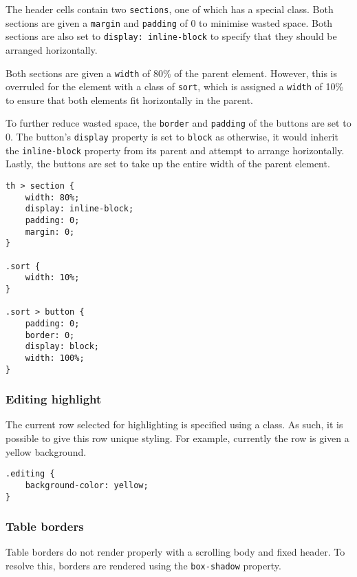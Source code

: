 \documentclass[letterpaper]{article}
\begin{document}
The header cells contain two \lstinline{sections}, one of which has a special class.
Both sections are given a \lstinline{margin} and \lstinline{padding} of 0 to minimise wasted space.
Both sections are also set to \lstinline{display: inline-block} to specify that they should be arranged horizontally.

Both sections are given a \lstinline{width} of 80\% of the parent element.
However, this is overruled for the element with a class of \lstinline{sort}, which is assigned a \lstinline{width} of 10\% to ensure that both elements fit horizontally in the parent.

To further reduce wasted space, the \lstinline{border} and \lstinline{padding} of the buttons are set to 0.
The button's \lstinline{display} property is set to \lstinline{block} as otherwise, it would inherit the \lstinline{inline-block} property from its parent and attempt to arrange horizontally.
Lastly, the buttons are set to take up the entire width of the parent element.

\begin{lstlisting}[firstnumber=47]
th > section {
    width: 80%;
    display: inline-block;
    padding: 0;
    margin: 0;
}

.sort {
    width: 10%;
}

.sort > button {
    padding: 0;
    border: 0;
    display: block;
    width: 100%;
}
\end{lstlisting}

\subsubsection{Editing highlight}

The current row selected for highlighting is specified using a class.
As such, it is possible to give this row unique styling.
For example, currently the row is given a yellow background.

\begin{lstlisting}[firstnumber=65]
.editing {
    background-color: yellow;
}
\end{lstlisting}

\subsubsection{Table borders}

Table borders do not render properly with a scrolling body and fixed header.
To resolve this, borders are rendered using the \lstinline{box-shadow} property.
\end{document}
